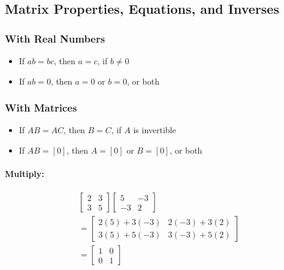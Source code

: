 \documentclass[
  letterpaper,
  DIV=11,
  numbers=noendperiod]{scrartcl}
\let\oldparagraph\paragraph
\renewcommand{\paragraph}[1]{\oldparagraph{#1}\mbox{}}
\providecommand{\tightlist}{%
  \setlength{\itemsep}{0pt}\setlength{\parskip}{0pt}}\usepackage{longtable,booktabs,array}
\begin{document}
\subsection{Matrix Properties, Equations, and
Inverses}\label{matrix-properties-equations-and-inverses}

\subsubsection{With Real Numbers}\label{with-real-numbers}

\begin{itemize}
\tightlist
\item
  If \(ab = bc\), then \(a = c\), if \(b \ne 0\)
\item
  If \(ab = 0\), then \(a = 0\) or \(b = 0\), or both
\end{itemize}

\subsubsection{With Matrices}\label{with-matrices}

\begin{itemize}
\tightlist
\item
  If \(AB = AC\), then \(B = C\), if \(A\) is invertible
\item
  If \(AB = [0]\), then \(A = [0]\) or \(B = [0]\), or both
\end{itemize}

\paragraph{Multiply:}\label{multiply}

\begin{align*}
&\begin{bmatrix} 2 & 3 \\ 3 & 5 \end{bmatrix}
\begin{bmatrix} 5 & -3 \\ -3 & 2 \end{bmatrix} \\
&= \begin{bmatrix} 2(5)+3(-3) & 2(-3)+3(2) \\ 3(5)+5(-3) & 3(-3)+5(2) \end{bmatrix} \\
&= \begin{bmatrix} 1 & 0 \\ 0 & 1 \end{bmatrix}
\end{align*}
\end{document}
